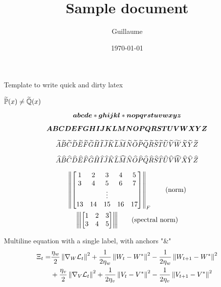 \documentclass{article}
\title{Sample document}
\author{Guillaume}
\date{\today}
\begin{document}
\maketitle

Template to write quick and dirty latex


$\tPP(x) \neq \tQQ(x)$

\begin{equation}
\ba \bb \bc \bd \be * \bg \bh \bi \bj \bk \bl * \bn \bo \bp \bq \br \bs \bt \bu \bv \bw \bx \by \bz
\end{equation}

\begin{equation}
\bA \bB \bC \bD \bE \bF \bG \bH \bI \bJ \bK \bL \bM \bN \bO \bP \bQ \bR \bS \bT \bU \bV \bW \bX \bY \bZ
\end{equation}

\begin{equation}
\tA \tB \tC \tD \tE \tF \tG \tH \tI \tJ \tK \tL \tM \tN \tO \tP \tQ \tR \tS \tT \tU \tV \tW \tX \tY \tZ
\end{equation}

\begin{equation}
\hA \hB \hC \hD \hE \hF \hG \hH \hI \hJ \hK \hL \hM \hN \hO \hP \hQ \hR \hS \hT \hU \hV \hW \hX \hY \hZ
\end{equation}

\begin{gather}
    \norm{
    \begin{bmatrix}
        1 & 2 & 3 & 4 & 5 \\
        3 & 4 & 5 & 6 & 7 \\
        && \vdots && \\
        13 & 14 & 15 & 16 & 17 \\
    \end{bmatrix}
    }_F \label{eq:norm} \tag{norm} \\
    \spnorm{
    \begin{bmatrix}
        1 & 2 & 3 \\
        3 & 4 & 5
    \end{bmatrix}
    } \label{eq:spnorm} \tag{spectral norm}
\end{gather}

Multiline equation with a single label, with anchors "\&"
\begin{equation}
\begin{split}
    \Xi_t =& \frac{\eta_w}{2}\norm{\nabla_{W} \LLL_t}^2 + \frac{1}{2\eta_w}\norm{W_t - W^*}^2 - \frac{1}{2\eta_w}\norm{W_{t+1} - W^*}^2 \\ 
    &+ \frac{\eta_v}{2}\norm{\nabla_{V} \LLL_t}^2 + \frac{1}{2\eta_v}\norm{V_t - V^*}^2 - \frac{1}{2\eta_v}\norm{V_{t+1} - V^*}^2 
\end{split}
\end{equation}
\end{document}
